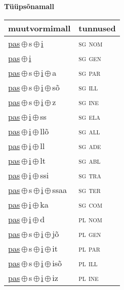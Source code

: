 

\vspace{3.5em}
\noindent \begin{minipage}{\textwidth}
\noindent \textbf{Tüüpsõnamall \,}\\

\begin{sideways}
\begin{tabular}{l l}
muutvormimall & tunnused \\
\hline
\underline{pas}\,$\oplus$\,s\,$\oplus$\,\underline{i} & \textsc{ sg nom } \\
\underline{pas}\,$\oplus$\,\underline{i} & \textsc{ sg gen } \\
\underline{pas}\,$\oplus$\,s\,$\oplus$\,\underline{i}\,$\oplus$\,a & \textsc{ sg par } \\
\underline{pas}\,$\oplus$\,s\,$\oplus$\,\underline{i}\,$\oplus$\,sõ & \textsc{ sg ill } \\
\underline{pas}\,$\oplus$\,s\,$\oplus$\,\underline{i}\,$\oplus$\,z & \textsc{ sg ine } \\
\underline{pas}\,$\oplus$\,\underline{i}\,$\oplus$\,ss & \textsc{ sg ela } \\
\underline{pas}\,$\oplus$\,\underline{i}\,$\oplus$\,llõ & \textsc{ sg all } \\
\underline{pas}\,$\oplus$\,\underline{i}\,$\oplus$\,ll & \textsc{ sg ade } \\
\underline{pas}\,$\oplus$\,\underline{i}\,$\oplus$\,lt & \textsc{ sg abl } \\
\underline{pas}\,$\oplus$\,\underline{i}\,$\oplus$\,ssi & \textsc{ sg tra } \\
\underline{pas}\,$\oplus$\,s\,$\oplus$\,\underline{i}\,$\oplus$\,ssaa & \textsc{ sg ter } \\
\underline{pas}\,$\oplus$\,\underline{i}\,$\oplus$\,ka & \textsc{ sg com } \\
\underline{pas}\,$\oplus$\,\underline{i}\,$\oplus$\,d & \textsc{ pl nom } \\
\underline{pas}\,$\oplus$\,s\,$\oplus$\,\underline{i}\,$\oplus$\,jõ & \textsc{ pl gen } \\
\underline{pas}\,$\oplus$\,s\,$\oplus$\,\underline{i}\,$\oplus$\,it & \textsc{ pl par } \\
\underline{pas}\,$\oplus$\,s\,$\oplus$\,\underline{i}\,$\oplus$\,isõ & \textsc{ pl ill } \\
\underline{pas}\,$\oplus$\,s\,$\oplus$\,\underline{i}\,$\oplus$\,iz & \textsc{ pl ine } \\

\end{tabular}
\end{sideways}
\end{minipage}
